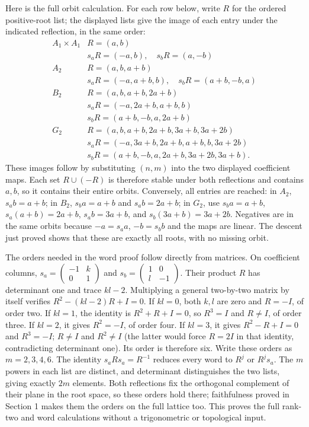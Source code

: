 \documentclass[11pt,a4paper,openany]{report}
\begin{document}
Here is the full orbit calculation. For each row below, write \(R\) for the ordered positive-root list; the displayed lists give the image of each entry under the indicated reflection, in the same order: \[
\begin{array}{c|l}
A_1\times A_1&R=(a,b)\\
&s_aR=(-a,b),\quad s_bR=(a,-b)\\[2pt]
A_2&R=(a,b,a+b)\\
&s_aR=(-a,a+b,b),\quad s_bR=(a+b,-b,a)\\[2pt]
B_2&R=(a,b,a+b,2a+b)\\
&s_aR=(-a,2a+b,a+b,b)\\
&s_bR=(a+b,-b,a,2a+b)\\[2pt]
G_2&R=(a,b,a+b,2a+b,3a+b,3a+2b)\\
&s_aR=(-a,3a+b,2a+b,a+b,b,3a+2b)\\
&s_bR=(a+b,-b,a,2a+b,3a+2b,3a+b).
\end{array}
\tag{3.2}
\] These images follow by substituting \((n,m)\) into the two displayed coefficient maps. Each set \(R\cup(-R)\) is therefore stable under both reflections and contains \(a,b\), so it contains their entire orbits. Conversely, all entries are reached: in \(A_2\), \(s_a b=a+b\); in \(B_2\), \(s_b a=a+b\) and \(s_a b=2a+b\); in \(G_2\), use \(s_b a=a+b\), \(s_a(a+b)=2a+b\), \(s_a b=3a+b\), and \(s_b(3a+b)=3a+2b\). Negatives are in the same orbits because \(-a=s_a a\), \(-b=s_b b\) and the maps are linear. The descent just proved shows that these are exactly all roots, with no missing orbit.

The orders needed in the word proof follow directly from matrices. On coefficient columns, \(s_a=\left(\begin{smallmatrix}-1&k\\0&1\end{smallmatrix}\right)\) and \(s_b=\left(\begin{smallmatrix}1&0\\l&-1\end{smallmatrix}\right)\). Their product \(R\) has determinant one and trace \(kl-2\). Multiplying a general two-by-two matrix by itself verifies \(R^2-(kl-2)R+I=0\). If \(kl=0\), both \(k,l\) are zero and \(R=-I\), of order two. If \(kl=1\), the identity is \(R^2+R+I=0\), so \(R^3=I\) and \(R\ne I\), of order three. If \(kl=2\), it gives \(R^2=-I\), of order four. If \(kl=3\), it gives \(R^2-R+I=0\) and \(R^3=-I\); \(R\ne I\) and \(R^2\ne I\) (the latter would force \(R=2I\) in that identity, contradicting determinant one). Its order is therefore six. Write these orders as \(m=2,3,4,6\). The identity \(s_aRs_a=R^{-1}\) reduces every word to \(R^j\) or \(R^js_a\). The \(m\) powers in each list are distinct, and determinant distinguishes the two lists, giving exactly \(2m\) elements. Both reflections fix the orthogonal complement of their plane in the root space, so these orders hold there; faithfulness proved in Section 1 makes them the orders on the full lattice too. This proves the full rank-two and word calculations without a trigonometric or topological input.
\end{document}
